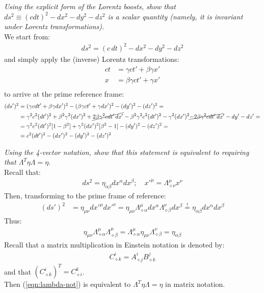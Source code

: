 \documentclass[../template.tex]{subfiles}
\begin{document}
\textit{Using the explicit form of the Lorentz boosts, show that $ds^2 \equiv (c dt)^2 - dx^2 - dy^2 -dz^2$ is a scalar quantity (namely, it is invariant under Lorentz transformations).}\\
We start from:
\begin{align*}
    ds^2 = (c\,dt)^2 - dx^2 - dy^2 - dz^2
\end{align*}
and simply apply the (inverse) Lorentz transformations:
\begin{align*}
    ct &=  \gamma ct' + \beta \gamma x'  \\
    x &= \beta \gamma ct' + \gamma x'  \\
\end{align*}
to arrive at the prime reference frame:
\begin{align*}
    (ds')^2 &= (\gamma c dt' + \beta \gamma dx')^2 - (\beta \gamma ct' + \gamma dx')^2 - (dy')^2 - (dz')^2 = \\
    &= \gamma^2 c^2 (dt')^2 + \beta^2 \gamma^2 (dx')^2 + \cancel{2\beta \gamma^2 c dt'\, dx' }- \beta^2 \gamma^2 c^2 (dt')^2 - \gamma^2 (dx')^2 \cancel{- 2\beta \gamma^2 c dt'\,dx}' - dy' - dz' =  \\
    &= \gamma^2 c^2 (dt')^2 [1-\beta^2] + \gamma^2 (dx')^2 [\beta^2 - 1] - (dy')^2 - (dz')^2 = \\
    &=  c^2 (dt')^2 - (dx')^2 - (dy')^2 - (dz')^2 \\
\end{align*}

\textit{Using the 4-vector notation, show that this statement is equivalent to requiring that $\Lambda^T \eta \Lambda = \eta$}.\\

Recall that:
\begin{align*}
    ds^2 = \eta_{\alpha \beta} dx^\alpha dx^\beta; \quad x'^\mu = \Lambda^\mu_{\diamond \nu} x^\nu
\end{align*}
Then, transforming to the prime frame of reference:
\begin{align*}
    (ds')^2 &= \eta_{\mu \nu} dx'^\mu dx'^\nu = \eta_{\mu \nu} \Lambda^\mu_{\diamond \alpha} dx^\alpha \Lambda^\nu_{\diamond \beta}dx^\beta \overset{!}{=} \eta_{\alpha \beta} dx^\alpha dx^\beta
\end{align*}
Thus:
\begin{align}
    \eta_{\mu \nu} \Lambda^\mu_{\diamond \alpha}\Lambda^\mu_{\diamond \beta} = \Lambda^\mu_{\diamond \alpha} \eta_{\mu \nu} \Lambda^\nu_{\diamond \beta} = \eta_{\alpha \beta}
    \label{eqn:lambda-not}
\end{align}
Recall that a matrix multiplication in Einstein notation is denoted by:
\begin{align*}
    C^i_{\diamond k} = A^i_{\diamond j} B^j_{\diamond k}
\end{align*}
and that $(C^i_{\diamond k})^T = C^k_{\diamond i}$.\\
Then (\ref{eqn:lambda-not}) is equivalent to $\Lambda^T \eta \Lambda = \eta$ in matrix notation.\\
\end{document}

